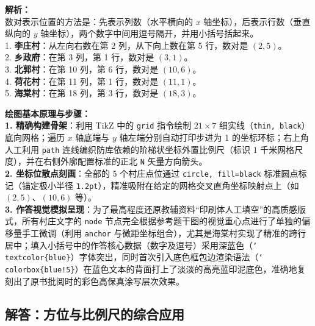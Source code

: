 \vspace{0.8cm}

{\small\color{gray}
\textbf{解析：}\\
数对表示位置的方法是：先表示列数（水平横向的 $x$ 轴坐标），后表示行数（垂直纵向的 $y$ 轴坐标），两个数字中间用逗号隔开，并用小括号括起来。\\
1. \textbf{李庄村}：从左向右数在第 2 列，从下向上数在第 5 行，数对是 $(2, 5)$。\\
2. \textbf{乡政府}：在第 3 列，第 1 行，数对是 $(3, 1)$。\\
3. \textbf{北郭村}：在第 10 列，第 6 行，数对是 $(10, 6)$。\\
4. \textbf{荷花村}：在第 11 列，第 1 行，数对是 $(11, 1)$。\\
5. \textbf{海棠村}：在第 18 列，第 3 行，数对是 $(18, 3)$。
}

\vspace{0.6cm}

{\small\color{blue!70!black}
\textbf{绘图基本原理与步骤：}\\
\textbf{1. 精确构建骨架}：利用 TikZ 中的 \texttt{grid} 指令绘制 $21 \times 7$ 细实线（\texttt{thin, black}）底向网格；遍历 $x$ 轴底端与 $y$ 轴左端分别自动打印步进为 1 的坐标环标；右上角人工利用 \texttt{path} 连线编织防库依赖的阶梯状坐标外置比例尺（标识 $1$ 千米网格尺度），并在右侧外廓配置标准的正北 \texttt{N} 矢量方向箭头。\\
\textbf{2. 坐标位散点刻画}：全部的 5 个村庄点位通过 \texttt{circle, fill=black} 标准圆点标记（锚定极小半径 \texttt{1.2pt}），精准吸附在给定的网格交叉直角坐标映射点上（如 $(2,5)、(10,6)$ 等）。\\
\textbf{3. 作答视觉模拟呈现}：为了最高程度还原教辅资料“印刷体人工填空”的高质感版式，所有村庄文字的 \texttt{node} 节点完全根据参考题干图的视觉重心点进行了单独的偏移量手工微调（利用 \texttt{anchor} 与微距坐标组合），尤其是海棠村实现了精准的跨行居中；填入小括号中的作答核心数据（数字及逗号）采用深蓝色（\texttt{\char`\\textcolor\{blue\}}）字体突出，同时首次引入底色框包边渲染语法（\texttt{\char`\\colorbox\{blue!5\}}）在蓝色文本的背面打上了淡淡的高亮蓝印泥底色，准确地复刻出了原书批阅时的彩色高保真涂写层次效果。
}

\vspace{0.8cm}
\vspace{0.8cm}

\newpage

\subsection{解答：方位与比例尺的综合应用}

